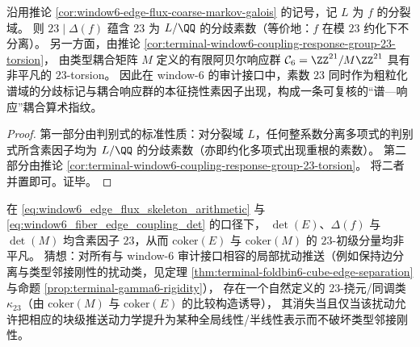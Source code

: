 \begin{corollary}\label{cor:window6-prime23-spectral-response}
沿用推论 \ref{cor:window6-edge-flux-coarse-markov-galois} 的记号，记 \(L\) 为 \(f\) 的分裂域。
则 \(23\mid \Delta(f)\) 蕴含 \(23\) 为 \(L/\QQ\) 的分歧素数（等价地：\(f\) 在模 \(23\) 约化下不分离）。
另一方面，由推论 \ref{cor:terminal-window6-coupling-response-group-23-torsion}，
由类型耦合矩阵 \(M\) 定义的有限阿贝尔响应群 \(\mathcal{C}_6=\ZZ^{21}/M\ZZ^{21}\) 具有非平凡的 \(23\)-torsion。
因此在 window-\(6\) 的审计接口中，素数 \(23\) 同时作为粗粒化谱域的分歧标记与耦合响应群的本征挠性素因子出现，构成一条可复核的“谱—响应”耦合算术指纹。
\end{corollary}
\begin{proof}
第一部分由判别式的标准性质：对分裂域 \(L\)，任何整系数分离多项式的判别式所含素因子均为 \(L/\QQ\) 的分歧素数（亦即约化多项式出现重根的素数）。
第二部分由推论 \ref{cor:terminal-window6-coupling-response-group-23-torsion}。
将二者并置即可。证毕。
\end{proof}

\begin{conjecture}\label{conj:window6-23-primary-obstruction-class}
在 \eqref{eq:window6_edge_flux_skeleton_arithmetic} 与 \eqref{eq:window6_fiber_edge_coupling_det} 的口径下，
\(\det(E)\)、\(\Delta(f)\) 与 \(\det(M)\) 均含素因子 \(23\)，从而
\(\mathrm{coker}(E)\) 与 \(\mathrm{coker}(M)\) 的 \(23\)-初级分量均非平凡。
猜想：对所有与 window-\(6\) 审计接口相容的局部扰动推送（例如保持边分离与类型邻接刚性的扰动类，见定理 \ref{thm:terminal-foldbin6-cube-edge-separation} 与命题 \ref{prop:terminal-gamma6-rigidity}），
存在一个自然定义的 \(23\)-挠元/同调类 \(\kappa_{23}\)（由 \(\mathrm{coker}(M)\) 与 \(\mathrm{coker}(E)\) 的比较构造诱导），
其消失当且仅当该扰动允许把相应的块级推送动力学提升为某种全局线性/半线性表示而不破坏类型邻接刚性。
\end{conjecture}

